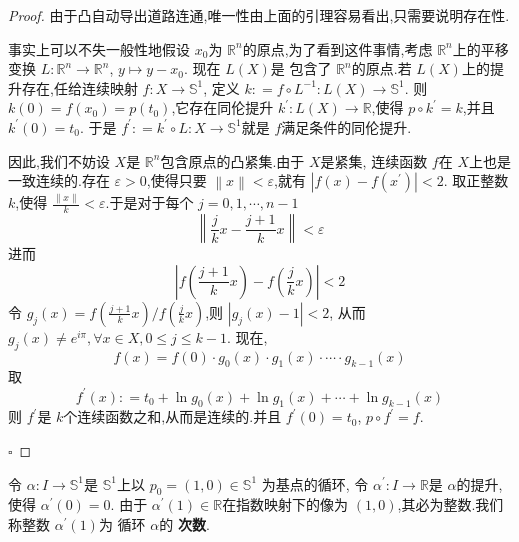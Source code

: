 \documentclass[../../几何与拓扑.tex]{subfiles}
\begin{document}
\begin{proof}

    由于凸自动导出道路连通,唯一性由上面的引理容易看出,只需要说明存在性.

    事实上可以不失一般性地假设 \(  x_0  \)为 \(  \mathbb{R} ^{n}  \)的原点,为了看到这件事情,考虑 \(  \mathbb{R} ^{n}  \)上的平移变换 \(  L : \mathbb{R} ^{n} \to \mathbb{R} ^{n}  \), \(  y\mapsto y-x_0  \).
    现在 \(  L\left( X \right)   \)是 包含了 \(  \mathbb{R} ^{n}  \)的原点.若 \(  L\left( X \right)   \)上的提升存在,任给连续映射 \(  f: X \to \mathbb{S}^{1}  \), 定义 \(  k: =  f\circ L^{-1} : L\left( X \right)\to \mathbb{S}^{1}   \).
    则 \(  k\left( 0 \right)= f\left( x_0 \right)=  p\left( t_0 \right)     \),它存在同伦提升 \(  k^{\prime} : L\left( X \right)\to \mathbb{R}    \),使得 \(  p\circ k^{\prime}  =  k  \),并且 \(  k^{\prime} \left(0 \right)= t_0   \).  
    于是 \(  f^{\prime} : =  k^{\prime} \circ L: X \to \mathbb{S}^{1}   \)就是 \(  f  \)满足条件的同伦提升.
    
    因此,我们不妨设 \(  X  \)是 \(  \mathbb{R} ^{n}  \)包含原点的凸紧集.由于 \( X \)是紧集, 连续函数 \(  f  \)在 \(  X  \)上也是一致连续的.存在 \(  \varepsilon >0  \),使得只要 \( \left\| x \right\|< \varepsilon    \),就有
    \(  \left| f\left( x \right)-f\left( x^{\prime}  \right)   \right|<2   \).     取正整数 \(  k  \),使得 \(  \frac{\left\| x \right\| }{k }< \varepsilon    \).于是对于每个 \(  j =  0, 1,\cdots,n -1  \) \[
    \left\| \frac{j}{k} x - \frac{j + 1 }{k } x  \right\|<  \varepsilon 
    \]     进而 \[
    \left| f\left( \frac{j + 1 }{k } x  \right)- f\left(  \frac{j }{k } x  \right)   \right|< 2 
    \]令  \(  g_{j} \left( x \right) =  f\left(  \frac{j + 1 }{k } x  \right) / f\left(  \frac{ j }{k }x  \right)     \),则 \(  \left| g_{j}\left( x \right)-1  \right|<2   \), 从而 \(  g_{j}\left( x \right) \neq  e^{i\pi }, \forall x \in X   , 0 \le j \le  k-1\).
     现在, \[
     f\left( x \right) =  f\left( 0 \right) \cdot  g_0\left( x \right)\cdot g_1\left( x \right)\cdot \cdots \cdot g_{k-1}\left( x \right)     
     \]   取 \[
     f^{\prime} \left( x \right): =  t_0+  \ln g_0\left( x \right)+ \ln g_1\left( x \right)+ \cdots + \ln g_{k-1}\left( x \right)    
     \]则 \(  f^{\prime}   \)是 \(  k  \)个连续函数之和,从而是连续的.并且 \(  f^{\prime} \left( 0 \right)= t_0   \), \(  p\circ f^{\prime} = f  \).    

    \hfill $\square$
\end{proof}

\begin{definition}
    令 \(   \alpha : I \to \mathbb{S}^{1}  \)是 \(  \mathbb{S}^{1}  \)上以 \(  p_0 =  \left( 1,0 \right) \in \mathbb{S}^{1}   \)   为基点的循环, 令
     \(  \alpha ^{\prime} : I \to \mathbb{R}   \)是 \(  \alpha   \)的提升,使得 \(   \alpha ^{\prime} \left( 0 \right)= 0   \).
     由于 \(  \alpha ^{\prime} \left( 1 \right) \in \mathbb{R}    \)在指数映射下的像为 \(  \left( 1,0 \right)   \),其必为整数.我们称整数 \(  \alpha ^{\prime} \left( 1 \right)   \)为 循环 \(  \alpha   \)的 \textbf{次数}.       
\end{definition}
\end{document}
